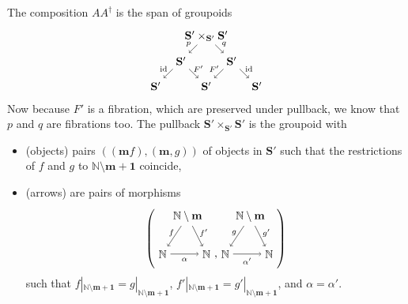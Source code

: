 \documentclass[11pt]{amsart}
\newcommand{\NN}{\mathbb{N}}
\newcommand{\cat}[1]{\mathbf{#1}}
\DeclareMathOperator{\id}{id}
\theoremstyle{remark}
\theoremstyle{definition}
\begin{document}
The composition $AA^\dagger$ is the span of groupoids
\[
\begin{tikzpicture}
	\node (v1) at (0,0) {$\cat{S'} \times_{\cat{S'}} \cat{S'}$};
	\node (v2) at (-0.8,-0.8) {$\cat{S'}$};
	\node (v3) at (0,-1.6) {$\cat{S'}$};
	\node (v4) at (0.8,-0.8) {$\cat{S'}$};
	\node (v5) at (-1.6,-1.6) {$\cat{S'}$};
	\node (v6) at (1.6,-1.6) {$\cat{S'}$};
	\draw [->]  (v1) edge node [shift={(-0.15,0.15)}] {\scriptsize $p$} (v2);
	\draw [->] (v1) edge node [shift={(0.15,0.15)}] {\scriptsize $q$} (v4);
	\draw [->]  (v2) edge node [shift={(-0.15,0.15)}] {\scriptsize $\id$} (v5);
	\draw [->] (v2) edge node [shift={(0.15,0.15)}] {\scriptsize $F'$} (v3);
	\draw [->]  (v4) edge node [shift={(-0.15,0.15)}] {\scriptsize $F'$} (v3);
	\draw [->]  (v4) edge node [shift={(0.15,0.15)}] {\scriptsize $\id$} (v6);
\end{tikzpicture}
\]
Now because $F'$ is a fibration, which are preserved under pullback, we know that $p$ and $q$ are fibrations too.  The pullback $\cat{S}' \times_{\cat{S}'} \cat{S}'$ is the groupoid with 
\begin{itemize}
	\item (objects) pairs $((\mathbf{m}f),(\mathbf{m},g))$ of objects in $\cat{S}'$ such that the restrictions of $f$ and $g$ to $\NN \setminus \mathbf{m+1}$ coincide,
	\item (arrows) are pairs of morphisms
	\[
	\left(
	\begin{tikzpicture}[baseline=12mm] 
		\begin{scope}
		\node (v1) at (0,2) {$\mathbb{N} \setminus \mathbf{m}$};
		\node (v2) at (-0.8,0.8) {$\mathbb{N}$};
		\node (v3) at (0.6,0.8) {$\mathbb{N}$};
		\draw [->] (v1) to node[shift={(-0.1,0.1)}] {\scriptsize $f$} (v2);
		\draw [->] (v1) to node[shift={(0.2,0.1)}] {\scriptsize $f'$} (v3);
		\draw [->] (v2) to node[below] {\scriptsize$\alpha$} (v3);
		\end{scope}
		\begin{scope}[shift={(2,0)}]
		\node (v1) at (0,2) {$\mathbb{N} \setminus \mathbf{m}$};
		\node (v2) at (-0.8,0.8) {$\mathbb{N}$};
		\node (v3) at (0.6,0.8) {$\mathbb{N}$};
		\draw [->] (v1) to node [shift={(-0.1,0.1)}] {\scriptsize $g$} (v2);
		\draw [->] (v1) to node [shift={(0.2,0.1)}] {\scriptsize $g'$} (v3);
		\draw [->] (v2) to node [below] {\scriptsize $\alpha'$} (v3);
		\end{scope}
		\node at (0.9,0.7) {,};
	\end{tikzpicture}
	\right)
	\]
	such that $f|_{\NN \setminus \mathbf{m+1}} = g|_{\NN \setminus \mathbf{m+1}}$, $f'|_{\NN \setminus \mathbf{m+1}} = g'|_{\NN \setminus \mathbf{m+1}}$, and $\alpha = \alpha'$.
\end{itemize}
\end{document}
